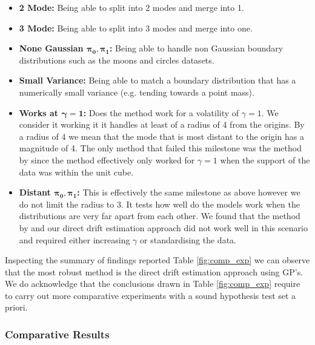 \documentclass[a4paper,12pt,twoside,openright]{report}
\theoremstyle{definition}
\begin{document}
\begin{itemize}
    \item \textbf{ 2 Mode:} Being able to split into 2 modes and merge into 1.
    \item \textbf{ 3 Mode:} Being able to split into 3 modes and merge into one.
    \item \textbf{None Gaussian $\bm{\pi_0,\pi_1}$:} Being able to handle non Gaussian boundary distributions such as the moons and circles datasets. 
    \item \textbf{Small Variance:} Being able to match a boundary distribution that has a numerically small variance (e.g. tending towards a point mass).  
    \item \textbf{Works at $\bm{\gamma=1}$:} Does the method work for a volatility of $\gamma=1$. We consider it working it it handles at least of a radius of 4 from the origins. By a radius of 4 we mean that the mode that is most distant to the origin has a magnitude of 4. The only method that failed this milestone was the method by \cite{pavon2018data} since the method effectively only worked for $\gamma=1$ when the support of the data was within the unit cube.
    \item \textbf{Distant $\bm{\pi_0, \pi_1}$:} This is effectively the same milestone as above however we do not limit the radius to 3. It tests how well do the models work when the distributions are very far apart from each other. We found that the method by \cite{pavon2018data} and our direct drift estimation approach did not work well in this scenario and required either increasing $\gamma$ or standardising the data.
\end{itemize}

Inspecting the summary of findings reported Table \ref{fig:comp_exp} we can observe that the most robust method is the direct drift estimation approach using GP's.  We do acknowledge that the conclusions drawn in Table \ref{fig:comp_exp} require to carry out more comparative experiments with a sound hypothesis test set a priori. 

\subsubsection{Comparative Results}
\end{document}
